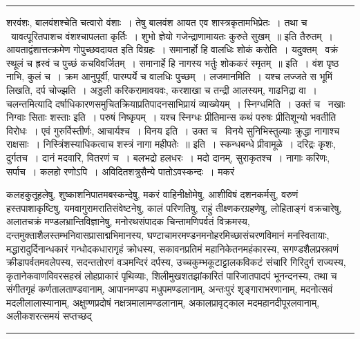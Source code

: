 \documentclass[11pt, openany]{book}
\begin{document}
\vspace{2mm}
\hrule

\noindent
{\s शरवंशः, बालवंशश्चेति चत्वारो वंशाः~। तेषु बालवंश आयत एव शास्त्रकृतामभिप्रेतः~। तथा च \textendash\ {\qt यावत्पूरितपाशच वंशश्चापलता कृर्तिः~। शुभो ज्ञेयो गजेन्द्राणामायतः कुरुते सुखम्~॥} इति तैरुतम्~। आयताद्वंशात्तत्क्रमेण गोपुच्छवदायत इति विग्रहः~। समानार्हो हि वालधिः शोकं करोति~। यदुक्तम् \textendash\ {\qt वक्रं स्थूलं च ह्रस्वं च पुच्छं कचविवर्जितम्~। समानार्हे हि नागस्य भर्तुः शोककरं स्मृतम्~॥} इति~। वंश पृष्ठ नाभि, कुलं च~। क्रम आनुपूर्वी, पारम्पर्ये च वालधिः पुच्छम्~। {\qtt लजमानमिति}~। यश्च लज्जते स भूमिं लिखति, दर्प चोज्झति~। अड्डली करिकरामावयवः, करशाखा च तन्द्री आलस्यम्, गाढनिद्रा वा~। चलन्तमित्यादि दर्षाधिकारणसमुचितक्रियाप्रतिपादनसाभिप्रायं व्याख्येयम्~। {\qtt स्निग्धमिति}~। उक्तं च \textendash\ {\qt नखाः निग्वाः सिताः शस्ताः} इति~। परुषं निष्कृपम्~। यश्च स्निग्धः प्रीतिमान्स कथं परुषः प्रीतिशून्यो भवतीति विरोधः~। एवं गुरुर्विस्तीर्णः, आचार्यश्च~। {\qtt विनय इति}~। उक्त च \textendash\ {\qt विनये सुनिभिस्तुल्याः क्रुद्धा नागाश्च राक्षसाः~। निस्त्रिंशस्याधिकत्वाच शस्त्रं नागा महीपतेः~॥} इति~। स्कन्धबन्धे प्रीवामूळे~। दरिद्रः कृशः, दुर्गतच~। दानं मदवारि, वितरणं च~। बलभद्रो हलधरः~। मदो दानम्, सुराकृतश्च~। नागाः करिणः, सर्पाच~। कलहो रणोऽपि~। अविदितशत्रुसैन्ये पातोऽवस्कन्दः~। मकरं}

\newpage

\noindent
कलहकुतूहलेषु, शुष्काशनिपातमबस्कन्देषु, मकरं वाहिनीक्षोमेषु, आशीविषं दशनकर्मसु, वरुणं हस्तपाशाकृष्टिषु, यमवागुरामरातिसंवेष्टनेषु, कालं परिणतिषु, राहुं तीक्ष्णकरग्रहणेषु, लोहिताङ्गं वक्रचारेषु, अलातचक्रं मण्डलभ्रान्तिविज्ञानेषु, मनोरथसंपादक चिन्तामणिपर्वतं विक्रमस्य, दन्तमुक्ताशैलस्तम्भनिवासप्रासाद्मभिमानस्य, घण्टाचामरमण्डनमनोहरमिच्छासंचरणविमानं मनस्वितायाः, मद्धारादुर्दिनान्धकारं गन्धोदकधारागृहं क्रोधस्य, सकावनप्रतिमं महानिकेतनमहंकारस्य, सगण्डशैलप्रस्रवणं क्रीडापर्वतमवलेपस्य, सदन्ततोरणं वञमन्दिरं दर्पस्य, उच्चकुम्भकूटाट्टालकविकटं संचारि गिरिदुर्ग राज्यस्य, कृतानेकवाणविवरसहस्रं लोहप्राकारं पृथिव्याः, शिलीमुखशतझांकारितं पारिजातपादपं भूनन्दनस्य, तथा च संगीतगृहं कर्णतालताण्डवानाम्, आपानमण्डप मधुपमण्डलानाम्, अन्तःपुरं शृङ्गाराभरणानाम्, मदनोत्सवं मदलीलालास्यानाम्, अक्षुण्णप्रदोषं नक्षत्रमालामण्डलानाम्, अकालप्रावृट्काल मदमहानदीपूरलवानाम्, अलीकशरत्समयं सप्तच्छद्\textendash

\vspace{2mm}
\hrule
\end{document}
